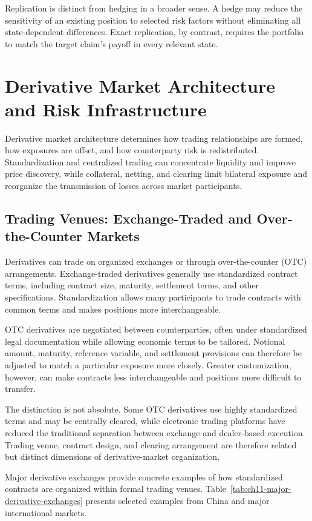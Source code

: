 Replication is distinct from hedging in a broader
sense. A hedge may reduce the sensitivity of an
existing position to selected risk factors without
eliminating all state-dependent differences.
Exact replication, by contrast, requires the
portfolio to match the target claim's payoff in
every relevant state.

\section{Derivative Market Architecture and Risk Infrastructure}

Derivative market architecture determines how trading relationships are formed, how exposures are offset, and how counterparty risk is redistributed. Standardization and centralized trading can concentrate liquidity and improve price discovery, while collateral, netting, and clearing limit bilateral exposure and reorganize the transmission of losses across market participants.

\subsection{Trading Venues: Exchange-Traded and Over-the-Counter Markets}

Derivatives can trade on organized exchanges or through over-the-counter (OTC) arrangements. Exchange-traded derivatives generally use standardized contract terms, including contract size, maturity, settlement terms, and other specifications. Standardization allows many participants to trade contracts with common terms and makes positions more interchangeable.

OTC derivatives are negotiated between counterparties, often under standardized legal documentation while allowing economic terms to be tailored. Notional amount, maturity, reference variable, and settlement provisions can therefore be adjusted to match a particular exposure more closely. Greater customization, however, can make contracts less interchangeable and positions more difficult to transfer.

The distinction is not absolute. Some OTC derivatives use highly standardized terms and may be centrally cleared, while electronic trading platforms have reduced the traditional separation between exchange and dealer-based execution. Trading venue, contract design, and clearing arrangement are therefore related but distinct dimensions of derivative-market organization.

Major derivative exchanges provide concrete examples of how standardized contracts are organized within formal trading venues. Table~\ref{tab:ch11-major-derivative-exchanges} presents selected examples from China and major international markets.

